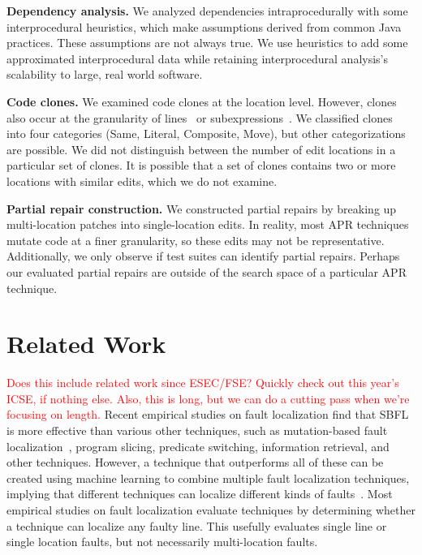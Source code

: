\documentclass[10pt, conference]{IEEEtran}
\newcommand\todo[1]{\textcolor{red}{#1}}
\begin{document}
\vspace{1ex}
\noindent\textbf{Dependency analysis.}
We analyzed dependencies intraprocedurally with some interprocedural 
heuristics, which make assumptions derived from common Java practices.
These assumptions are not always true. We use heuristics to add some
approximated interprocedural data while retaining interprocedural 
analysis's scalability to large, real world software.

\vspace{1ex}
\noindent\textbf{Code clones.}
We examined code clones at the location level.  However, clones also occur at the
granularity of lines~\cite{JiaClones} or
subexpressions~\cite{microclones}. We classified clones into four
categories (Same, Literal, Composite, Move), but other categorizations 
are possible.
%
We did not distinguish between the number
of edit locations in a particular set of clones. It is possible that a set of
clones contains two or more locations with similar edits, which we do not examine. 

\vspace{1ex}
\noindent\textbf{Partial repair construction.}
We constructed partial repairs by breaking up multi-location patches
into single-location edits.
In reality, most APR techniques mutate code at a finer granularity, so
these edits may not be representative.  Additionally, we only observe if test suites
can identify partial repairs. Perhaps our evaluated partial repairs
are outside of the search space of a
particular APR technique.

\section{Related Work}
\label{sec:related}

\todo{Does this include related work since ESEC/FSE?  Quickly check out this
  year's ICSE, if nothing else.}
\todo{Also, this is long, but we can do a cutting pass when we're focusing on length.}
Recent empirical studies on fault localization find that 
SBFL is more effective than various other techniques, such as 
mutation-based fault localization~\cite{pearson2017evaluating, mut-analysis}, program 
slicing, predicate switching,  information retrieval, and other techniques. 
However, a 
technique that outperforms all of these can be created using machine learning to combine 
multiple fault localization techniques, implying that different techniques can 
localize different kinds of faults~\cite{zou2019empirical}. Most empirical 
studies on fault localization evaluate techniques by determining whether a 
technique can localize any faulty line. This usefully evaluates single line or single 
location faults, but not necessarily multi-location faults.
\end{document}
